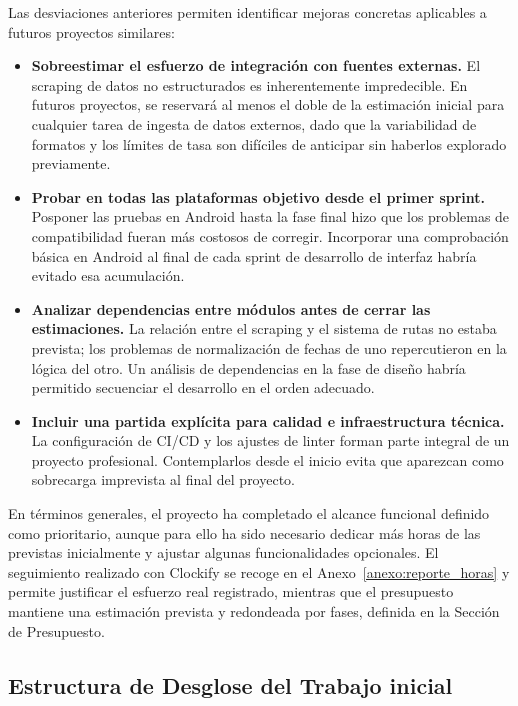 Las desviaciones anteriores permiten identificar mejoras concretas aplicables a futuros proyectos similares:

\begin{itemize}
    \item \textbf{Sobreestimar el esfuerzo de integración con fuentes externas.} El scraping de datos no estructurados es inherentemente impredecible. En futuros proyectos, se reservará al menos el doble de la estimación inicial para cualquier tarea de ingesta de datos externos, dado que la variabilidad de formatos y los límites de tasa son difíciles de anticipar sin haberlos explorado previamente.

    \item \textbf{Probar en todas las plataformas objetivo desde el primer sprint.} Posponer las pruebas en Android hasta la fase final hizo que los problemas de compatibilidad fueran más costosos de corregir. Incorporar una comprobación básica en Android al final de cada sprint de desarrollo de interfaz habría evitado esa acumulación.

    \item \textbf{Analizar dependencias entre módulos antes de cerrar las estimaciones.} La relación entre el scraping y el sistema de rutas no estaba prevista; los problemas de normalización de fechas de uno repercutieron en la lógica del otro. Un análisis de dependencias en la fase de diseño habría permitido secuenciar el desarrollo en el orden adecuado.

    \item \textbf{Incluir una partida explícita para calidad e infraestructura técnica.} La configuración de CI/CD y los ajustes de linter forman parte integral de un proyecto profesional. Contemplarlos desde el inicio evita que aparezcan como sobrecarga imprevista al final del proyecto.
\end{itemize}

En términos generales, el proyecto ha completado el alcance funcional definido como prioritario, aunque para ello ha sido necesario dedicar más horas de las previstas inicialmente y ajustar algunas funcionalidades opcionales. El seguimiento realizado con Clockify se recoge en el Anexo~\ref{anexo:reporte_horas} y permite justificar el esfuerzo real registrado, mientras que el presupuesto mantiene una estimación prevista y redondeada por fases, definida en la Sección de Presupuesto.

\subsection{Estructura de Desglose del Trabajo inicial}

